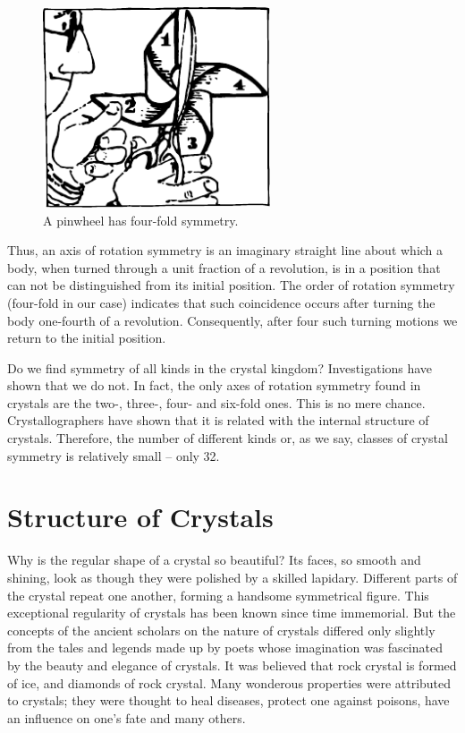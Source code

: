 \begin{figure}[!ht]
\centering
\includegraphics[width=0.6\textwidth]{figures/fig-02-08.pdf}
\caption{A pinwheel has four-fold symmetry.}
\label{fig-2.8}
\end{figure}



Thus, an axis of rotation symmetry is an imaginary straight line about which a body, when turned through a unit fraction of a revolution, is in a position that can­ not be distinguished from its initial position. The order of rotation symmetry (four-fold in our case) indicates that such coincidence occurs after turning the body one-fourth of a revolution. Consequently, after four such turning motions we return to the initial position.

Do we find symmetry of all kinds in the crystal king­dom? Investigations have shown that we do not. In fact, the only axes of rotation symmetry found in crystals are the two-, three-, four- and six-fold ones. This is no mere chance. Crystallographers have shown that it is related with the internal structure of crystals. Therefore, the number of different kinds or, as we say, classes of crystal symmetry is relatively small -- only 32.

\section{Structure of Crystals}

Why is the regular shape of a crystal so beautiful? Its faces, so smooth and shining, look as though they were polished by a skilled lapidary. Different parts of the crystal repeat one another, forming a handsome sym­metrical figure. This exceptional regularity of crystals has been known since time immemorial. But the con­cepts of the ancient scholars on the nature of crystals differed only slightly from the tales and legends made up by poets whose imagination was fascinated by the beauty and elegance of crystals. It was believed that rock crystal is formed of ice, and diamonds of rock crystal. Many wonderous properties were attributed to crystals; they were thought to heal diseases, protect one against poisons, have an influence on one’s fate and many others.

